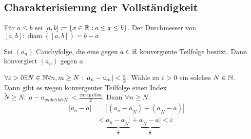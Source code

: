 \subsection{Charakterisierung der Vollständigkeit}
Für $ a \leq b $ sei $ [a, b] \coloneqq \{ x \in \mathbb{R} : a \leq x \leq b \} $. Der Durchmesser von $ [ a, b ] : \operatorname{diam}([a, b]) = b - a $

\begin{sublemma}
	Sei $ (a_n) $ Cauchyfolge, die eine gegen $ a\in \mathbb{R} $ konvergiente Teilfolge besitzt. Dann konvergiert $ (a_n ) $ gegen $ a $.
	\begin{subproof*}
		$\forall\varepsilon > 0 \exists N \in \mathbb{N} \forall n, m \geq N : | a_n - a_m | < \frac{\varepsilon}{2} $. Wähle zu $ \varepsilon > 0 $ ein solches $ N \in \mathbb{N} $.
		Dann gibt es wegen konvergenter Teilfolge einen Index $ \widetilde{N} \geq N : | a - a_{widetilde{N}} | < \frac{varepsilon}{2}$.
		Dann $ \forall n \geq N : $
		\begin{align*}
			| a_n - a | &= | ( a_n - a_{\widetilde{N}} ) + ( a_{\widetilde{N}} - a ) |\\
			&< \underbrace{a_n - a_{\widetilde{N}}|}_{\frac{\varepsilon}{2}} + \underbrace{a_{\widetilde{N}} - a|}_{\frac{\varepsilon}{2}} < \varepsilon
		\end{align*}
	\end{subproof*}
\end{sublemma}

